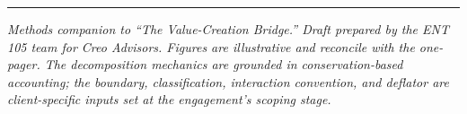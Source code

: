 \documentclass[11pt]{article}
\begin{document}
\vspace{6pt}\hrule\vspace{5pt}
{\footnotesize\itshape Methods companion to ``The Value-Creation Bridge.'' Draft prepared by
the ENT 105 team for Creo Advisors. Figures are illustrative and reconcile with the one-pager.
The decomposition mechanics are grounded in conservation-based accounting; the boundary,
classification, interaction convention, and deflator are client-specific inputs set at the
engagement's scoping stage.}
\end{document}
